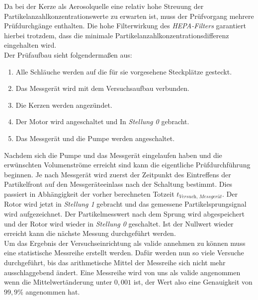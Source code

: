 Da bei der Kerze als Aerosolquelle eine relativ hohe Streuung der Partikelanzahlkonzentrationswerte zu erwarten ist, muss der Pr\"{u}fvorgang mehrere Pr\"{u}fdurchg\"{a}nge enthalten. Die hohe Filterwirkung des \textit{HEPA-Filters} garantiert hierbei trotzdem, dass die minimale Partikelanzahlkonzentrationsdifferenz eingehalten wird.\\
Der Pr\"{u}faufbau sieht folgenderma{\ss}en aus:
\begin{enumerate}
	\item Alle Schl\"{a}uche werden auf die f\"{u}r sie vorgesehene Steckpl\"{a}tze gesteckt. 
	\item Das Messger\"{a}t wird mit dem Versuchsaufbau verbunden.
	\item Die Kerzen werden angez\"{u}ndet.
	\item Der Motor wird angeschaltet und In \textit{Stellung 0} gebracht.
	\item Das Messger\"{a}t und die Pumpe werden angeschaltet.
\end{enumerate}
Nachdem sich die Pumpe und das Messger\"{a}t eingelaufen haben und die erw\"{u}nschten Volumenstr\"{o}me erreicht sind kann die eigentliche Pr\"{u}fdurchf\"{u}hrung beginnen. Je nach Messger\"{a}t wird zuerst der Zeitpunkt des Eintreffens der Partikelfront auf den Messger\"{a}teeinlass nach der Schaltung bestimmt. Dies passiert in Abh\"{a}ngigkeit der vorher berechneten Totzeit \(t_\textit{Versuch, Messger\"{a}t}\). Der Rotor wird jetzt in \textit{Stellung 1} gebracht und das gemessene Partikelsprungsignal wird aufgezeichnet. Der Partikelmesswert nach dem Sprung wird abgespeichert und der Rotor wird wieder in \textit{Stellung 0} geschaltet. Ist der Nullwert wieder erreicht kann die n\"{a}chste Messung durchgef\"{u}hrt werden.\\
Um das Ergebnis der Versuchseinrichtung als valide annehmen zu k\"{o}nnen muss eine statistische Messreihe erstellt werden. Daf\"{u}r werden nun so viele Versuche durchgef\"{u}hrt, bis das arithmetische Mittel der Messreihe sich nicht mehr ausschlaggebend \"{a}ndert. Eine Messreihe wird von uns als valide angenommen wenn die Mittelwert\"{a}nderung unter \(0,001\) ist, der Wert also eine Genauigkeit von \(99,9\%\) angenommen hat.

